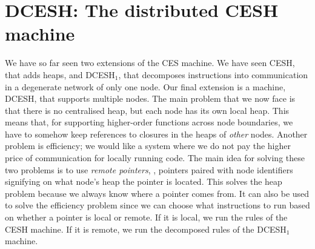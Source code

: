 \documentclass{article}
\theoremstyle{definition}
\newcommand{\DCESHi}{DCESH$_1$}
\newcommand{\DCESHn}{DCESH}
\newcommand{\Conid}[1]{\mathit{#1}}
\newcommand{\Varid}[1]{\mathit{#1}}
\def\resethooks{\global\let\SaveRestoreHook\empty
  \global\let\ColumnHook\empty}
\let\hspost\empty
\renewcommand\Varid[1]{\mathord{\textsf{#1}}}
\let\Conid\Varid
\newcommand\Keyword[1]{\textsf{\textbf{#1}}}
\renewcommand\Keyword[1]{\textsf{\underline{#1}}}
\renewcommand\Varid[1]{\textsf{#1}}
\begin{document}
\section{\DCESHn: The distributed CESH machine} \label{section:DCESH}

\begin{comment}
\begin{hscode}\SaveRestoreHook
\column{B}{@{}>{\hspre}l<{\hspost}@{}}\column{E}{@{}>{\hspre}l<{\hspost}@{}}\>[B]{}\Keyword{open}\;\Keyword{import}\;\Conid{GeneralLemmas}\;\Keyword{using}\;(\Conid{Dec};\Varid{\char95 ≡\char95 }){}\<[E]\ColumnHook
\end{hscode}\resethooks
\end{comment}

We have so far seen two extensions of the CES machine. We have seen
CESH, that adds heaps, and \DCESHi{}, that decomposes instructions
into communication in a degenerate network of only one node.
Our final extension is a machine, \DCESHn{}, that supports multiple nodes.
The main problem that we now face is that there is no centralised heap,
but each node has its own local heap. This means that, for
supporting higher-order functions across node boundaries, we have to
somehow keep references to closures in the heaps of \emph{other} nodes.
Another problem is efficiency; we would like a system where we do
not pay the higher price of communication for locally running code.
The main idea for solving these two problems is to use
\emph{remote pointers}, {\textsmaller[.5]{\ensuremath{\Conid{RPtr}\;\mathrel{=}\;\Conid{Ptr}\;\Varid{×}\;\Conid{Node}}}}, pointers paired with node
identifiers signifying on what node's heap the pointer is located.
This solves the heap problem because we always know
where a pointer comes from. It can also be used to solve the
efficiency problem since we can choose what instructions to run based on
whether a pointer is local or remote. If it is local, we run the
rules of the CESH machine. If it is remote, we run the
decomposed rules of the \DCESHi{} machine.
\end{document}
